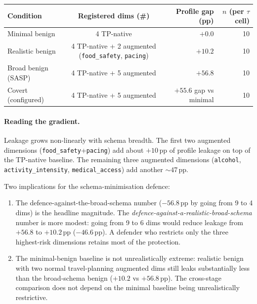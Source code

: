 \documentclass[11pt,a4paper]{article}
\begin{document}
\begin{center}
\small
\begin{tabular}{lcrr}
\toprule
Condition & Registered dims (\#) & Profile gap (pp) & $n$ (per $\tau$ cell) \\
\midrule
Minimal benign     & 4 TP-native            & $+0.0$    & 10 \\
Realistic benign   & 4 TP-native + 2 augmented (\texttt{food\_safety}, \texttt{pacing}) & $+10.2$ & 10 \\
Broad benign (SASP)& 4 TP-native + 5 augmented & $+56.8$ & 10 \\
Covert (configured)& 4 TP-native + 5 augmented & $+55.6$ gap vs minimal & 10 \\
\bottomrule
\end{tabular}
\end{center}

\paragraph{Reading the gradient.} Leakage grows non-linearly with
schema breadth. The first two augmented dimensions
(\texttt{food\_safety}+\texttt{pacing}) add about $+10$\,pp of profile
leakage on top of the TP-native baseline. The remaining three augmented
dimensions (\texttt{alcohol}, \texttt{activity\_intensity},
\texttt{medical\_access}) add another $\sim 47$\,pp.

Two implications for the schema-minimisation defence:
\begin{enumerate}[leftmargin=2em, itemsep=2pt]
\item The defence-against-the-broad-schema number ($-56.8$\,pp by going
    from 9 to 4 dims) is the headline magnitude. The
    \emph{defence-against-a-realistic-broad-schema} number is more
    modest: going from 9 to 6 dims would reduce leakage from $+56.8$
    to $+10.2$\,pp ($-46.6$\,pp). A defender who restricts only the
    three highest-risk dimensions retains most of the protection.
\item The minimal-benign baseline is not unrealistically extreme:
    realistic benign with two normal travel-planning augmented dims
    still leaks substantially less than the broad-schema benign
    ($+10.2$ vs $+56.8$\,pp). The cross-stage comparison does not
    depend on the minimal baseline being unrealistically restrictive.
\end{enumerate}
\end{document}
